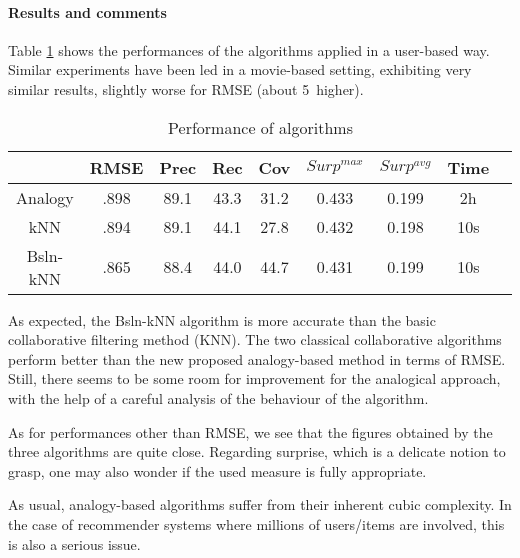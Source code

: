 \documentclass{llncs}
\begin{document}
\paragraph{Results and comments\\}

Table \ref{table:res} shows the performances of the algorithms applied in a
user-based way. Similar experiments have been led in a movie-based setting, exhibiting
very similar results, slightly worse for RMSE (about 5\permil\ higher).

\begin{table}[!ht]
\centering
\caption{Performance of algorithms}
\label{table:res}
\begin{tabular}{| c || c | c | c | c | c | c | c | c |}
\hline
& RMSE & Prec & Rec & Cov & $Surp^{max}$ & $Surp^{avg}$ & Time \\
\hline
Analogy   & .898 & 89.1 & 43.3 & 31.2 & 0.433 & 0.199 & 2h \\
kNN     & .894 & 89.1 & 44.1 & 27.8 & 0.432 & 0.198 & 10s \\
Bsln-kNN & .865 & 88.4 & 44.0 & 44.7 & 0.431 & 0.199 & 10s \\
\hline
\end{tabular}

\end{table}

As expected, the Bsln-kNN algorithm is more accurate than the basic
collaborative filtering method (KNN). The two classical collaborative
algorithms perform better than the new proposed analogy-based method in terms
of RMSE. Still, there seems to be some room for improvement for the analogical
approach, with the help of a careful analysis of the behaviour of the
algorithm.

As for performances other than RMSE, we see that the figures obtained by the
three algorithms are quite close. Regarding surprise, which is a delicate
notion to grasp, one may also wonder if the used measure is fully appropriate.

As usual, analogy-based algorithms suffer from their inherent cubic complexity.
In the case of recommender systems where millions of users/items are involved,
this is also a serious issue. 
\end{document}
